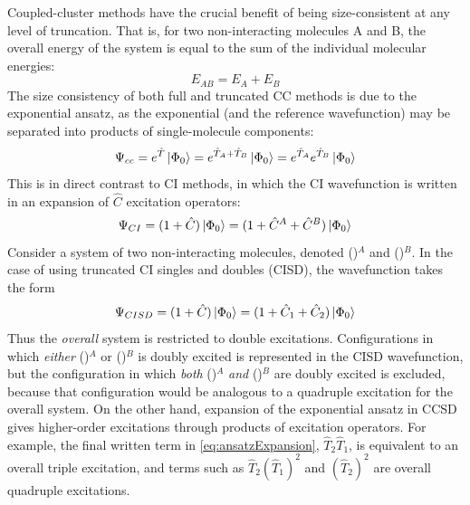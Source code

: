 \documentclass[letterpaper, 12pt]{article}
\begin{document}
Coupled-cluster methods have the crucial benefit of being size-consistent at any level of truncation. That is, for two non-interacting molecules A and B, the overall energy of the system is equal to the sum of the individual molecular energies:
\begin{equation}
E_{AB}= E_{A} + E_{B}
\end{equation}
The size consistency of both full and truncated CC methods is due to the exponential ansatz, as the exponential (and the reference wavefunction) may be separated into products of single-molecule components:
\begin{equation}
\Psi_{cc}=e^{\hat{T}} \ket{\Phi_0} = e^{\hat{T}_A + \hat{T}_B}\ket{\Phi_0} = e^{\hat{T}_A} e^{\hat{T}_B}\ket{\Phi_0}
\end{equation}
This is in direct contrast to CI methods, in which the CI wavefunction is written in an expansion of $\hat{C}$ excitation operators:
\begin{equation}
\Psi_{CI} = (1 + \hat{C}) \ket{\Phi_0} =  (1 + \hat{C}^A + \hat{C}^B)\ket{\Phi_0}
\end{equation}
Consider a system of two non-interacting  molecules, denoted ()$^A$ and ()$^B$. In the case of using truncated CI singles and doubles (CISD), the wavefunction takes the form 
\begin{equation}
\Psi_{CISD} = (1+\hat{C}) \ket{\Phi_0}=(1+\hat{C}_1+\hat{C}_2) \ket{\Phi_0}
\end{equation}
Thus the \textit{overall} system is restricted to double excitations. Configurations in which \textit{either} ()$^A$ or ()$^B$ is doubly excited is represented in the CISD wavefunction, but the configuration in which \textit{both} ()$^A$ \textit{and} ()$^B$ are doubly excited is excluded, because that configuration would be analogous to a quadruple excitation for the overall system. \cite{SO}
On the other hand, expansion of the exponential ansatz in CCSD gives higher-order excitations through products of excitation operators. For example, the final written term in \eqref{eq:ansatzExpansion}, $\hat{T}_2\hat{T}_1$, is equivalent to an overall triple excitation, and terms such as $\hat{T}_2 (\hat{T}_1)^2$ and $(\hat{T}_2)^2$ are overall quadruple excitations. \\
\end{document}
